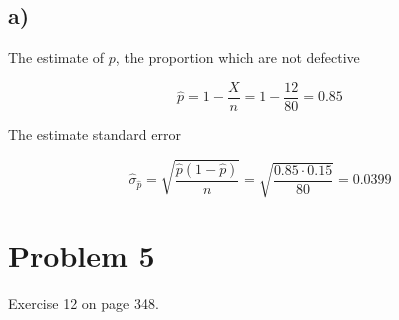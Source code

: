 \documentclass[a4paper,11pt]{article}
\begin{document}
\subsection*{a)}

The estimate of $p$, the proportion which are not defective

\[ \hat{p} = 1 - \frac{X}{n} = 1 - \frac{12}{80} = 0.85 \]

The estimate standard error

\[ \hat{\sigma}_{\hat{p}} = \sqrt{\frac{\hat{p}(1 - \hat{p})}{n}} = \sqrt{\frac{0.85 \cdot 0.15}{80}} = 0.0399\]

\clearpage

\section*{Problem 5}

Exercise 12 on page 348.
\end{document}
